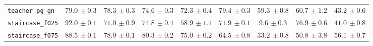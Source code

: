 \begin{tabular}{lcccccccc}
\texttt{teacher\_pg\_gn} & $79.0{\scriptstyle\,\pm0.3}$ & $78.3{\scriptstyle\,\pm0.3}$ & $74.6{\scriptstyle\,\pm0.3}$ & $72.3{\scriptstyle\,\pm0.4}$ & $79.4{\scriptstyle\,\pm0.3}$ & $59.3{\scriptstyle\,\pm0.8}$ & $60.7{\scriptstyle\,\pm1.2}$ & $43.2{\scriptstyle\,\pm0.6}$ \\
\texttt{staircase\_f025} & $92.0{\scriptstyle\,\pm0.1}$ & $71.0{\scriptstyle\,\pm0.9}$ & $74.8{\scriptstyle\,\pm0.4}$ & $58.9{\scriptstyle\,\pm1.1}$ & $71.9{\scriptstyle\,\pm0.1}$ & $9.6{\scriptstyle\,\pm0.3}$ & $76.9{\scriptstyle\,\pm0.6}$ & $41.0{\scriptstyle\,\pm0.8}$ \\
\texttt{staircase\_f075} & $88.5{\scriptstyle\,\pm0.1}$ & $78.9{\scriptstyle\,\pm0.1}$ & $80.3{\scriptstyle\,\pm0.2}$ & $75.0{\scriptstyle\,\pm0.2}$ & $64.5{\scriptstyle\,\pm0.8}$ & $33.2{\scriptstyle\,\pm0.8}$ & $50.8{\scriptstyle\,\pm3.8}$ & $56.1{\scriptstyle\,\pm0.7}$ \\
\hline
\end{tabular}
